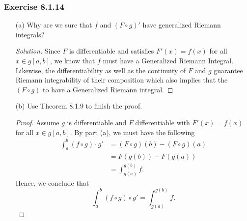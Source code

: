 \subsubsection{Exercise 8.1.14} 
\begin{enumerate}
    \item[(a)] Why are we sure that \( f  \) and \( (F \circ g)' \) have generalized Riemann integrals? 
        \begin{proof}[Solution]
            Since \( F  \) is differentiable and satisfies \( F'(x) = f(x)  \) for all \( x \in g[a,b]  \), we know that \( f  \) must have a Generalized Riemann Integral. Likewise, the differentiability as well as the continuity of \( F \) and \( g  \) guarantee Riemann integrability of their composition which also implies that the \( (F \circ g)  \) to have a Generalized Riemann integral. 
        \end{proof}
    \item[(b)] Use Theorem 8.1.9 to finish the proof.
        \begin{proof}
            Assume \( g  \) is differentiable and \( F  \) differentiable with \( F'(x) = f(x) \) for all \( x \in g[a,b] \). By part (a), we must have the following 
        \begin{align*}
            \int_{ a }^{ b } (f \circ g) \cdot g' &= (F \circ g)(b) - (F \circ g)(a) \\
                                                  &= F(g(b)) - F(g(a)) \\
                                                  &= \int_{ g(a) }^{ g(b) } f.
        \end{align*}
        Hence, we conclude that 
        \[ \int_{ a }^{ b } (f \circ g) \circ g'  = \int_{ g(a) }^{ g(b) } f.\]
        \end{proof}
\end{enumerate}


